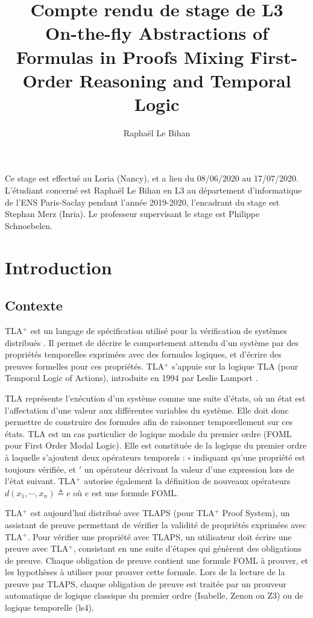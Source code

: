 \documentclass[12pt]{article}
\title{%
  Compte rendu de stage de L3\\
  \vspace{8pt}
  \large On-the-fly Abstractions of Formulas in Proofs
Mixing First-Order Reasoning and Temporal Logic}
\author{Raphaël Le Bihan}
\newcommand{\bpar}[1]{\marginpar{\color{myblue}\footnotesize\raggedright#1}}
\begin{document}
\fancyfoot[CEO]{\thepage}

\maketitle

Ce stage est effectué au Loria (Nancy), et a lieu du 08/06/2020 au 17/07/2020.
L'étudiant concerné est Raphaël Le Bihan en L3 au département d'informatique de l'ENS Paris-Saclay pendant l'année 2019-2020, l'encadrant du stage est Stephan Merz (Inria).
Le professeur supervisant le stage est Philippe Schnoebelen.

\setcounter{tocdepth}{2}
\tableofcontents

\section{Introduction}

\subsection{Contexte}

TLA$^+$ est un langage de spécification utilisé pour la vérification de systèmes distribués \cite{lamport2002}.
Il permet de décrire le comportement attendu d'un système par des propriétés temporelles exprimées avec des formules logiques, et d'écrire des preuves formelles pour ces propriétés.
TLA$^+$ s'appuie sur la logique TLA (pour Temporal Logic of Actions), introduite en 1994 par Leslie Lamport \cite{lamport1994}.

TLA représente l'exécution d'un système comme une suite d'états, où un état est l'affectation d'une valeur aux différentes variables du système.
Elle doit donc permettre de construire des formules afin de raisonner temporellement sur ces états.
TLA est un cas particulier de logique modale du premier ordre (FOML pour First Order Modal Logic).
Elle est constituée de la logique du premier ordre à laquelle s'ajoutent deux opérateurs temporels : $\square$ indiquant qu'une propriété est toujours vérifiée, et $'$ un opérateur décrivant la valeur d'une expression lors de l'état suivant.
TLA$^+$ autorise également la définition de nouveaux opérateurs $d(x_1, \cdots, x_n) \triangleq e$ où $e$ est une formule FOML.

TLA$^+$ est aujourd'hui distribué avec TLAPS \cite{TLAPSurl} (pour TLA$^+$ Proof System), un assistant de preuve permettant de vérifier la validité de propriétés exprimées avec TLA$^+$.
Pour vérifier une propriété avec TLAPS, un utilisateur doit écrire une preuve avec TLA$^+$, consistant en une suite d'étapes %
qui génèrent des obligations de preuve.
Chaque obligation de preuve contient une formule FOML à prouver, et les hypothèses à utiliser pour prouver cette formule.
Lors de la lecture de la preuve par TLAPS, chaque obligation de preuve est traitée par un prouveur automatique de logique classique du premier ordre (Isabelle, Zenon ou Z3) ou de logique temporelle (ls4).
\end{document}
